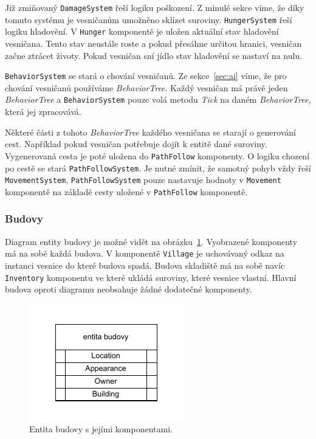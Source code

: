 Již zmiňovaný \texttt{DamageSystem} řeší logiku poškození. Z minulé sekce víme, že díky tomuto systému je vesničanům umožněno sklízet suroviny. \texttt{HungerSystem} řeší logiku hladovění. V \texttt{Hunger} komponentě je uložen aktuální stav hladovění vesničana. Tento stav neustále roste a pokud přesáhne určitou hranici, vesničan začne ztrácet životy. Pokud vesničan sní jídlo stav hladovění se nastaví na nulu.

\texttt{BehaviorSystem} se stará o chování vesničanů. Ze sekce~\ref{sec:ai} víme, že pro chování vesničanů používáme \textit{BehaviorTree}. Každý vesničan má právě jeden \textit{BehaviorTree} a \texttt{BehaviorSystem} pouze volá metodu \textit{Tick} na daném \textit{BehaviorTree}, která jej zpracovává.

Některé části z tohoto \textit{BehaviorTree} každého vesničana se starají o generování cest. Například pokud vesničan potřebuje dojít k entitě dané suroviny. Vygenerovaná cesta je poté uložena do \texttt{PathFollow} komponenty. O logiku chození po cestě se stará \texttt{PathFollowSystem}. Je nutné zmínit, že samotný pohyb vždy řeší \texttt{MovementSystem}, \texttt{PathFollowSystem} pouze nastavuje hodnoty v \texttt{Movement} komponentě na základě cesty uložené v \texttt{PathFollow} komponentě.

\subsubsection{Budovy}
Diagram entity budovy je možné vidět na obrázku~\ref{fig:building}. Vyobrazené komponenty má na sobě každá budova. V komponentě \texttt{Village} je uchovávaný odkaz na instanci vesnice do které budova spadá. Budova skladiště má na sobě navíc \texttt{Inventory} komponentu ve které ukládá suroviny, které vesnice vlastní. Hlavní budova oproti diagramu neobsahuje žádné dodatečné komponenty.

\begin{figure}[!htb]
  \centering
  \includegraphics[width=0.4\linewidth]{img/building.pdf}
  \caption{Entita budovy s jejími komponentami.}
  \label{fig:building}
\end{figure}

